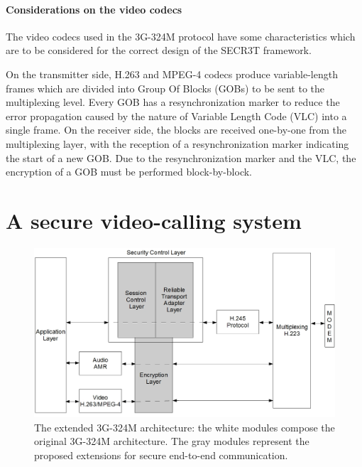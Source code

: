 \documentclass[10pt, conference, compsocconf]{IEEEtran}
\begin{document}

\paragraph{Considerations on the video codecs}
\label{par:videocons}
The video codecs used in the 3G-324M protocol have some characteristics which are to be considered for the correct design of the SECR3T framework.

On the transmitter side, H.263 and MPEG-4 codecs produce variable-length frames which are divided into Group Of Blocks (GOBs) to be sent to the multiplexing level. Every GOB has a resynchronization marker to reduce the error propagation caused by the nature of Variable Length Code (VLC) into a single frame.
On the receiver side, the blocks are received one-by-one from the multiplexing layer, with the reception of a resynchronization marker indicating the start of a new GOB.
Due to the resynchronization marker and the VLC, the encryption of a GOB must be performed block-by-block.


\section{A secure video-calling system}
\label{par:design}


\begin{figure}[!htbp]
\centering
\includegraphics[scale=0.20]{pics/framework_bn.jpg}
\caption{The extended 3G-324M architecture: the white modules compose the original 3G-324M architecture. The gray modules represent the proposed extensions for secure end-to-end communication.}
\label{fig:3g324sec}
\end{figure}
\end{document}
